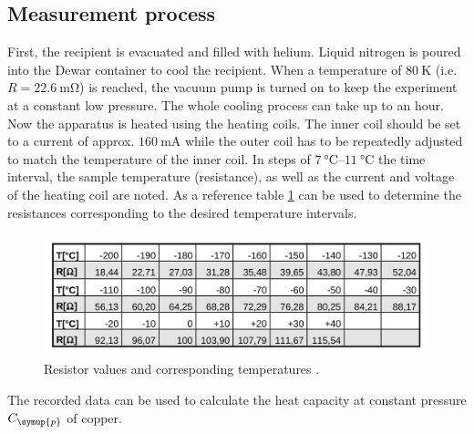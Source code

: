 \subsection{Measurement process}
First, the recipient is evacuated and filled with helium. Liquid nitrogen is poured into the Dewar container to cool the recipient. When a temperature of $\qty{80}{\kelvin}$
(i.e. $R = \qty{22.6}{\milli\ohm}$) is reached, the vacuum pump is turned on to keep the experiment at a constant low pressure. The whole cooling process can take up to an hour.
Now the apparatus is heated using the heating coils. The inner coil should be set to a current of approx. $\qty{160}{\milli\ampere}$ while the outer coil has
to be repeatedly adjusted to match the temperature of the inner coil. In steps of $\qtyrange{7}{11}{\celsius}$ the time interval, the sample temperature (resistance),
as well as the current and voltage of the heating coil are noted. As a reference table \ref{fig:R_T} can be used to determine the resistances corresponding to the desired temperature
intervals.

\begin{figure}
    \centering
    \includegraphics[width = .8\textwidth]{"content/pics/R_T.png"}
    \caption{Resistor values and corresponding temperatures \cite{V47}.}
    \label{fig:R_T}
\end{figure}

The recorded data can be used to calculate the heat capacity at constant pressure $C_{\symup{p}}$ of copper.
